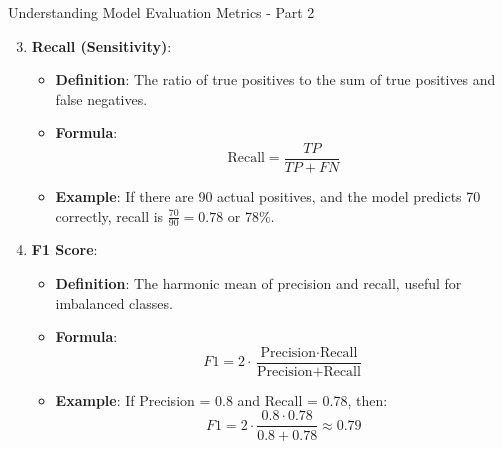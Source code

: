\documentclass[aspectratio=169]{beamer}
\begin{document}
\begin{frame}[fragile]{Understanding Model Evaluation Metrics - Part 2}
    \begin{enumerate}
        \setcounter{enumi}{2}
        \item \textbf{Recall (Sensitivity)}:
            \begin{itemize}
                \item \textbf{Definition}: The ratio of true positives to the sum of true positives and false negatives.
                \item \textbf{Formula}:
                \begin{equation}
                    \text{Recall} = \frac{TP}{TP + FN}
                \end{equation}
                \item \textbf{Example}: If there are 90 actual positives, and the model predicts 70 correctly, recall is \( \frac{70}{90} = 0.78 \) or 78\%.
            \end{itemize}
        
        \item \textbf{F1 Score}:
            \begin{itemize}
                \item \textbf{Definition}: The harmonic mean of precision and recall, useful for imbalanced classes.
                \item \textbf{Formula}:
                \begin{equation}
                    F1 = 2 \cdot \frac{\text{Precision} \cdot \text{Recall}}{\text{Precision} + \text{Recall}}
                \end{equation}
                \item \textbf{Example}: If Precision = 0.8 and Recall = 0.78, then:
                \begin{equation}
                    F1 = 2 \cdot \frac{0.8 \cdot 0.78}{0.8 + 0.78} \approx 0.79
                \end{equation}
            \end{itemize}
    \end{enumerate}
\end{frame}
\end{document}
